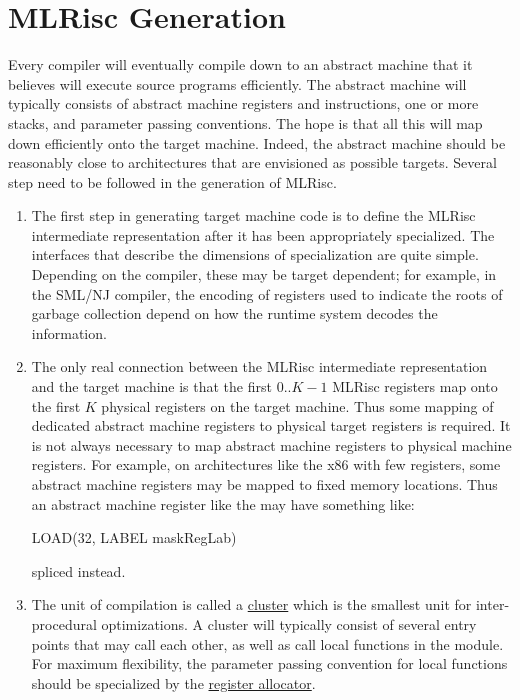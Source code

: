 \section{MLRisc Generation}
  Every compiler will eventually compile down to an abstract machine
  that it believes will execute source programs efficiently. The
  abstract machine will typically consists of abstract machine
  registers and instructions, one or more stacks, and parameter
  passing conventions.  The hope is that all this will map down
  efficiently onto the target machine. Indeed, the abstract machine
  should be reasonably close to architectures that are envisioned as
  possible targets. Several step need to be followed in the generation
  of MLRisc.

  \begin{enumerate}
   \item The first step in generating target machine code is to define
   the MLRisc intermediate representation after it has been
   appropriately specialized. The interfaces that describe the
   dimensions of specialization are quite simple. Depending on the
   compiler, these may be target dependent; for example, in the SML/NJ
   compiler, the encoding of registers used to indicate the roots of
   garbage collection depend on how the runtime system decodes the
   information.

  \item The only real connection between the MLRisc intermediate
  representation and the target machine is that the first
  $0..K-1$ MLRisc registers map onto the first $K$
  physical registers on the target machine. Thus some mapping of
  dedicated abstract machine registers to physical target registers is
  required. It is not always necessary to map abstract machine
  registers to physical machine registers. For example, on
  architectures like the x86 with few registers, some abstract machine
  registers may be mapped to fixed memory locations. Thus an abstract
  machine register like the  may have something like:
\begin{SML}
  LOAD(32, LABEL maskRegLab) 
\end{SML}
spliced instead.

  \item The unit of compilation is called a 
   \href{cluster.html}{cluster} which
  is the smallest unit for inter-procedural optimizations. A cluster
  will typically consist of several entry points that may call each
  other, as well as call local functions in the module. For maximum
  flexibility, the parameter passing convention for local functions
  should be specialized by the \href{mlrisc-ra.html}{register allocator}.


\end{enumerate}
